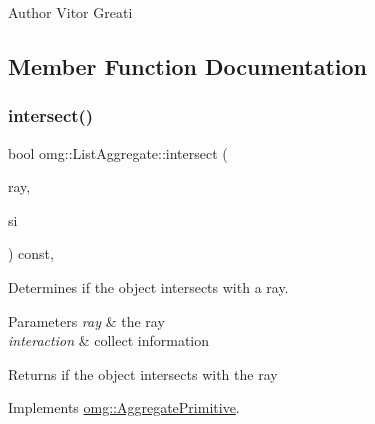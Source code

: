 \begin{DoxyAuthor}{Author}
Vitor Greati 
\end{DoxyAuthor}


\subsection{Member Function Documentation}
\mbox{\label{classomg_1_1_list_aggregate_a55fdd3b0fa387cb14488b86634b3e877}} 
\subsubsection{\texorpdfstring{intersect()}{intersect()}\hspace{0.1cm}{\footnotesize\ttfamily [1/2]}}
{\footnotesize\ttfamily bool omg\+::\+List\+Aggregate\+::intersect (\begin{DoxyParamCaption}\item[{const \mbox{\hyperlink{classomg_1_1_ray}{Ray}} \&}]{ray,  }\item[{\mbox{\hyperlink{classomg_1_1_surface_interaction}{Surface\+Interaction}} $\ast$}]{si }\end{DoxyParamCaption}) const\hspace{0.3cm}{\ttfamily [inline]}, {\ttfamily [virtual]}}



Determines if the object intersects with a ray. 


\begin{DoxyParams}{Parameters}
{\em ray} & the ray \\
\hline
{\em interaction} & collect information \\
\hline
\end{DoxyParams}
\begin{DoxyReturn}{Returns}
if the object intersects with the ray 
\end{DoxyReturn}


Implements \mbox{\hyperlink{classomg_1_1_aggregate_primitive_a07ab041d9071295e4f648475c7163470}{omg\+::\+Aggregate\+Primitive}}.

\mbox{\label{classomg_1_1_list_aggregate_ac3abd78ca5ce87eb3821bf19bf5194cf}} 
